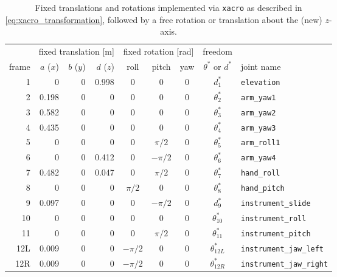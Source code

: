 \vspace{2mm}
\begin{table}[htbp]
\small
\centering
\begin{tabular}{r | rrr | ccc | c l}\hline
 & \multicolumn{3}{c|}{fixed translation  [m]} & \multicolumn{3}{c|}{fixed rotation [rad]} & freedom & \\
frame  & $a$ ($x$)  & $b$ ($y$)  & $d$ ($z$)  & roll  & pitch & yaw & $\theta^*$ or $d^*$ & joint name\\\hline
1 & 0 & 0 & 0.998 & 0 & 0 & 0 & $d_1^*$ & \texttt{elevation}\\
2 & 0.198 & 0 & 0 & 0 & 0 & 0 & $\theta_2^*$ & \texttt{arm\_yaw1} \\
3 & 0.582 & 0 & 0 & 0 & 0 & 0 & $\theta_3^*$ & \texttt{arm\_yaw2} \\
4 & 0.435 & 0 & 0 & 0 & 0 & 0 & $\theta_4^*$ & \texttt{arm\_yaw3} \\
5 & 0 & 0 & 0 & 0 & $\pi/2$ & 0 & $\theta_5^*$ & \texttt{arm\_roll1} \\
6 & 0 & 0 & 0.412 & 0 & $-\pi/2$ & 0 & $\theta_6^*$ & \texttt{arm\_yaw4} \\
7 & 0.482 & 0 & 0.047 & 0 & $\pi/2$ & 0 & $\theta_7^*$ & \texttt{hand\_roll} \\
8 & 0 & 0 & 0 & $\pi/2$ & 0 & 0 & $\theta_8^*$ & \texttt{hand\_pitch} \\
9 & 0.097 & 0 & 0 & 0 & $-\pi/2$ &  0 & $d_9^*$ & \texttt{instrument\_slide} \\
10 & 0 & 0 & 0 & 0 & 0 & 0 & $\theta_{10}^*$ & \texttt{instrument\_roll} \\
11 & 0 & 0 & 0 & 0 & $\pi/2$ & 0 & $\theta_{11}^*$ & \texttt{instrument\_pitch} \\
12L & 0.009 & 0 & 0 & $-\pi/2$ & 0 & 0 & $\theta_{12L}^*$ & \texttt{instrument\_jaw\_left} \\
12R & 0.009 & 0 & 0 & $-\pi/2$ & 0 & 0 & $\theta_{12R}^*$ & \texttt{instrument\_jaw\_right} \\
	\end{tabular}
	\caption{Fixed translations and rotations implemented via \texttt{xacro} as described in \autoref{eq:xacro_transformation}, followed by a free rotation or translation about the (new) $z$-axis.}
	\label{tab:compromise_param}
\end{table}



